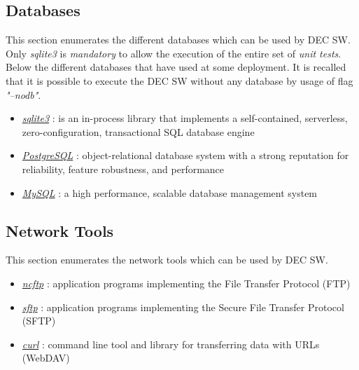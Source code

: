 \documentclass[dec_sum_main.tex]{subfiles}
\begin{document}
\subsection{Databases}
This section enumerates the different databases which can be used by DEC SW. Only \textit{sqlite3} is \textit{mandatory} to allow the execution of the entire set of \textit{unit tests}. Below the different databases that have used at some deployment. It is recalled that it is possible to execute the DEC SW without any database by usage of flag \textit{"--nodb"}.
\par
\begin{itemize}
	\item \href{https://www.sqlite.org}{\textit{sqlite3}} : is an in-process library that implements a self-contained, serverless, zero-configuration, transactional SQL database engine
	\item \href{https://www.postgresql.org/}{\textit{PostgreSQL}} : object-relational database system with a strong reputation for reliability, feature robustness, and performance
	\item \href{https://www.mysql.com/}{\textit{MySQL}} : a high performance, scalable database management system
\end{itemize}

\subsection{Network Tools}
This section enumerates the network tools which can be used by DEC SW.
\par
\begin{itemize}
	\item \href{https://www.ncftp.com}{\textit{ncftp}} : application programs implementing the File Transfer Protocol (FTP)
	\item \href{https://www.openssh.com}{\textit{sftp}} : application programs implementing the Secure File Transfer Protocol (SFTP)
	\item \href{https://curl.haxx.se}{\textit{curl}} : command line tool and library for transferring data with URLs (WebDAV)
\end{itemize}
\end{document}
